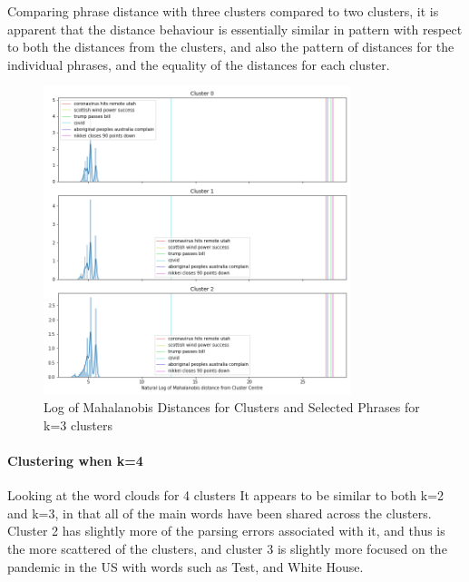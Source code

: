 Comparing phrase distance with three clusters compared to two clusters, it is apparent that the distance behaviour is essentially similar in pattern with respect to both the distances from the clusters, and also the pattern of distances for the individual phrases, and the equality of the distances for each cluster.  
\begin{figure}[H]
	\centering
	\includegraphics[width=0.8\textwidth]{images/words_kmeans_mahalanobis_distance_k=3.png}
	\caption{Log of Mahalanobis Distances for Clusters and Selected Phrases for k=3 clusters}
	\label{fig:wordsk3}
\end{figure}
\paragraph{Clustering when k=4}
Looking at the word clouds for 4 clusters It appears to be similar to both k=2 and k=3, in that all of the main words have been shared across the clusters. Cluster 2 has slightly more of the parsing errors associated with it, and thus is the more scattered of the clusters, and cluster 3 is slightly more focused on the pandemic in the US with words such as Test, and White House.

